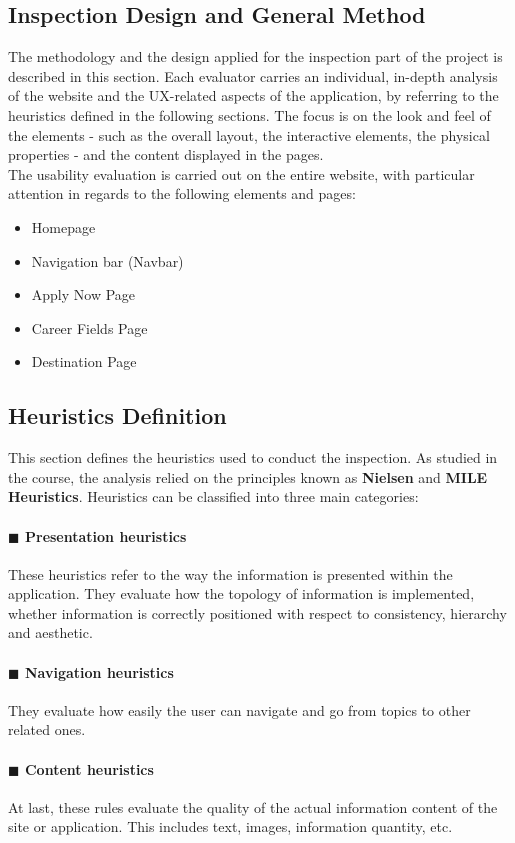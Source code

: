 \documentclass[11pt]{article} %
\begin{document}
\subsection{Inspection Design and General Method}
The methodology and the design applied for the inspection part of the project is described in this section. 
Each evaluator carries an individual, in-depth analysis of the website and the UX-related aspects of the application, by referring to the heuristics defined in the following sections.
The focus is on the look and feel of the elements - such as the overall layout, the interactive elements, the physical properties - and the content displayed in the pages. \\
The usability evaluation is carried out on the entire website, with particular attention in regards to the following elements and pages:
\begin{itemize}
    \item Homepage
    \item Navigation bar (Navbar)
    \item Apply Now Page
    \item Career Fields Page
    \item Destination Page
\end{itemize}

\subsection{Heuristics Definition}
This section defines the heuristics used to conduct the inspection. As studied in the course, the analysis relied on the principles known as \textbf{Nielsen} and \textbf{MILE Heuristics}.
Heuristics can be classified into three main categories:
\paragraph{$\blacksquare$ Presentation heuristics} These heuristics refer to the way the information is presented within the application. They evaluate how the topology of information is implemented, whether information is correctly positioned with respect to consistency, hierarchy and aesthetic.
\paragraph{$\blacksquare$ Navigation heuristics} They evaluate how easily the user can navigate and go from topics to other related ones. 
\paragraph{$\blacksquare$ Content heuristics} At last, these rules evaluate the quality of the actual information content of the site or application. This includes text, images, information quantity, etc. 
\end{document}
